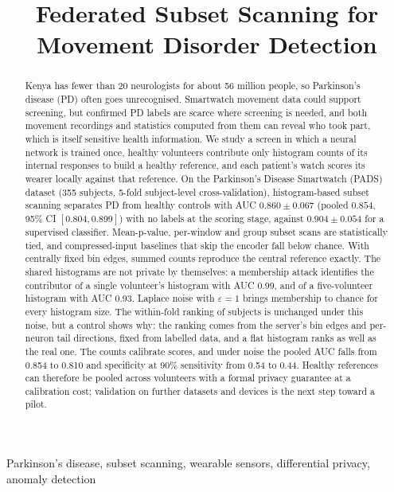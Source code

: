 \documentclass{article}
\title{Federated Subset Scanning for Movement Disorder Detection}
\begin{document}
\maketitle

\begin{abstract}
Kenya has fewer than 20 neurologists for about 56 million people, so Parkinson's disease (PD) often goes unrecognised. Smartwatch movement data could support screening, but confirmed PD labels are scarce where screening is needed, and both movement recordings and statistics computed from them can reveal who took part, which is itself sensitive health information. We study a screen in which a neural network is trained once, healthy volunteers contribute only histogram counts of its internal responses to build a healthy reference, and each patient's watch scores its wearer locally against that reference. On the Parkinson's Disease Smartwatch (PADS) dataset (355 subjects, 5-fold subject-level cross-validation), histogram-based subset scanning separates PD from healthy controls with AUC $0.860 \pm 0.067$ (pooled $0.854$, 95\% CI $[0.804, 0.899]$) with no labels at the scoring stage, against $0.904 \pm 0.054$ for a supervised classifier. Mean-p-value, per-window and group subset scans are statistically tied, and compressed-input baselines that skip the encoder fall below chance. With centrally fixed bin edges, summed counts reproduce the central reference exactly. The shared histograms are not private by themselves: a membership attack identifies the contributor of a single volunteer's histogram with AUC $0.99$, and of a five-volunteer histogram with AUC $0.93$. Laplace noise with $\varepsilon = 1$ brings membership to chance for every histogram size. The within-fold ranking of subjects is unchanged under this noise, but a control shows why: the ranking comes from the server's bin edges and per-neuron tail directions, fixed from labelled data, and a flat histogram ranks as well as the real one. The counts calibrate scores, and under noise the pooled AUC falls from 0.854 to 0.810 and specificity at 90\% sensitivity from 0.54 to 0.44. Healthy references can therefore be pooled across volunteers with a formal privacy guarantee at a calibration cost; validation on further datasets and devices is the next step toward a pilot.
\end{abstract}

\begin{keywords}
Parkinson's disease, subset scanning, wearable sensors, differential privacy, anomaly detection
\end{keywords}
\end{document}
